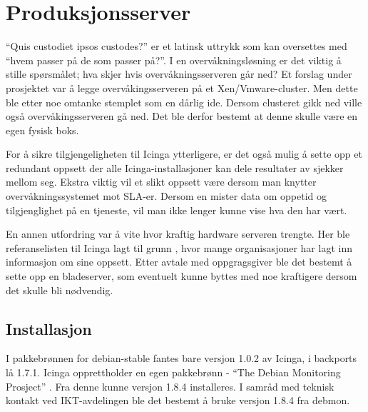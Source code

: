 \section{Produksjonsserver}
“Quis custodiet ipsos custodes?” er et latinsk uttrykk som kan oversettes med “hvem passer på de som passer på?”. I en overvåkningsløsning er det viktig å stille spørsmålet; hva skjer hvis overvåkningsserveren går ned? Et forslag under prosjektet var å legge overvåkingsserveren på et Xen/Vmware-cluster. Men dette ble etter noe omtanke stemplet som en dårlig ide. Dersom clusteret gikk ned ville også overvåkingsserveren gå ned. Det ble derfor bestemt at denne skulle være en egen fysisk boks. 

For å sikre tilgjengeligheten til Icinga ytterligere, er det også mulig å sette opp et redundant oppsett der alle Icinga-installasjoner kan dele resultater av sjekker mellom seg. Ekstra viktig vil et slikt oppsett være dersom man knytter overvåkningssystemet mot SLA-er. Dersom en mister data om oppetid og tilgjenglighet på en tjeneste, vil man ikke lenger kunne vise hva den har vært.

En annen utfordring var å vite hvor kraftig hardware serveren trengte. Her ble referanselisten til Icinga lagt til grunn \cite{icingainaction}, hvor mange organisasjoner har lagt inn informasjon om sine oppsett. Etter avtale med oppgragsgiver ble det bestemt å sette opp en bladeserver, som eventuelt kunne byttes med noe kraftigere dersom det skulle bli nødvendig. 

\subsection{Installasjon}
I pakkebrønnen for debian-stable fantes bare versjon 1.0.2 av Icinga, i backports lå 1.7.1. Icinga opprettholder en egen pakkebrønn - ``The Debian Monitoring Prosject'' \cite{debmon}. Fra denne kunne versjon 1.8.4 installeres. I samråd med teknisk kontakt ved IKT-avdelingen ble det bestemt å bruke versjon 1.8.4 fra debmon.

